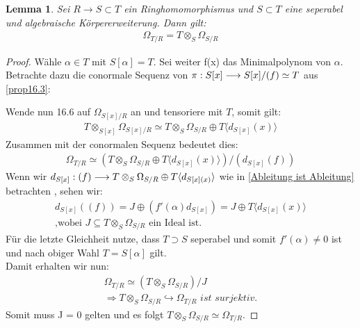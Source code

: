 \documentclass[10pt,a4paper]{report}
\newcounter{Aussage}[chapter]
\newtheorem{lemma}[Aussage]{Lemma}
\newcommand{\functionfront}[3]{\nolinebreak{#1:#2 \longrightarrow #3}}
\newcommand{\divR}[2]{\Omega_{#1/#2}}
\newcommand{\divf}[1]{d_{#1}}
\newcommand{\Tensor}[3]{#1 \otimes_{#2} #3}
\newcommand{\tensor}[3]{#1 \otimes #3}
\begin{document}
\begin{lemma}\label{Aufbaulemma}
Sei $R \longrightarrow S \subset T$ ein Ringhomomorphismus und $S \subset T$ eine seperabel und algebraische Körpererweiterung. Dann gilt:
\begin{gather*}
\divR{T}{R} = \Tensor{T}{S}{\divR{S}{R}}
\end{gather*}
\end{lemma}
\begin{proof}
Wähle $\alpha \in T$ mit $S[\alpha] = T$. Sei weiter f(x) das Minimalpolynom von $\alpha$. Betrachte dazu die conormale Sequenz von  $\functionfront{\pi}{S[x]}{S[x]/(f) \simeq T}$ aus \cref{prop16.3}:
\begin{center}
\end{center}
Wende nun 16.6 auf $\divR{S[x]}{R}$ an und tensoriere mit $T$, somit gilt:
\begin{gather*}
\Tensor{T}{S[x]}{\divR{S[x]}{R}} \simeq \Tensor{T}{S}{\divR{S}{R}} \oplus T\langle \divf{S[x]}(x) \rangle
\end{gather*}
Zusammen mit der conormalen Sequenz bedeutet dies:
\begin{gather*}
\divR{T}{R} \simeq (\Tensor{T}{S}{\divR{S}{R}} \oplus T\langle \divf{S[x]}(x) \rangle)/(\divf{S[x]}(f))
\end{gather*}
Wenn wir $\functionfront{\divf{S[x]}}{(f)}{\Tensor{T}{S}{\divR{S}{R}} \oplus T\langle \divf{S[x](x)} \rangle}$ wie in \cref{Ableitung ist Ableitung} betrachten , sehen wir:
\begin{gather*}
\divf{S[x]}((f)) = J \oplus (f'(\alpha)\divf{S[x]}) = J \oplus T\langle \divf{S[x]}(x) \rangle \\
\text{,wobei $J \subseteq \Tensor{T}{S}{\divR{S}{R}}$ ein Ideal ist.}
\end{gather*}
Für die letzte Gleichheit nutze, dass $T \supset S$ seperabel und somit $f'(\alpha) \neq 0$ ist und nach obiger Wahl $T = S[\alpha]$ gilt.\\
Damit erhalten wir nun:
\begin{gather*}
\divR{T}{R} \simeq (\Tensor{T}{S}{\divR{S}{R}})/J \\
\Rightarrow \Tensor{T}{S}{\divR{S}{R}} \hookrightarrow \divR{T}{R} \textit{ ist surjektiv.}
\end{gather*}
Somit muss J = 0 gelten und es folgt $\Tensor{T}{S}{\divR{S}{R}} \simeq \divR{T}{R}$.
\end{proof}
\end{document}

